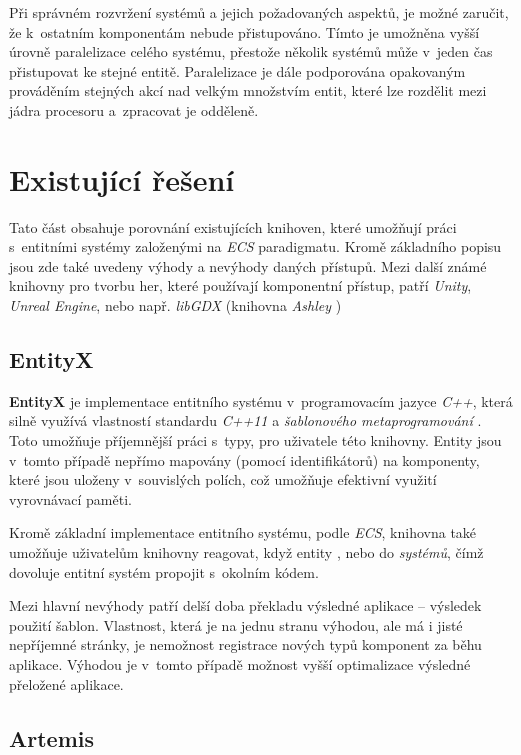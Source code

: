 Při správném rozvržení systémů a jejich požadovaných aspektů, je možné zaručit, že k~ostatním komponentám nebude přistupováno. Tímto je umožněna vyšší úrovně paralelizace celého systému, přestože několik systémů může v~jeden čas přistupovat ke stejné entitě. Paralelizace je dále podporována opakovaným prováděním stejných akcí nad velkým množstvím entit, které lze rozdělit mezi jádra procesoru a~zpracovat je odděleně.

\section{Existující řešení}

Tato část obsahuje porovnání existujících knihoven, které umožňují práci s~entitními systémy založenými na \emph{ECS} paradigmatu. Kromě základního popisu jsou zde také uvedeny výhody a nevýhody daných přístupů. Mezi další známé knihovny pro tvorbu her, které používají komponentní přístup, patří \emph{Unity}, \emph{Unreal Engine}, nebo např. \emph{libGDX} (knihovna \emph{Ashley} \cite{Ashley})

\subsection{EntityX}

\textbf{EntityX} \cite{EntityX} je implementace entitního systému v~programovacím jazyce \emph{C++}, která silně využívá vlastností standardu \emph{C++11} a \emph{šablonového metaprogramování} \cite{CppMetaprogramming}. Toto umožňuje příjemnější práci s~typy, pro uživatele této knihovny. Entity jsou v~tomto případě nepřímo mapovány (pomocí identifikátorů) na komponenty, které jsou uloženy v~souvislých polích, což umožňuje efektivní využití vyrovnávací paměti. 

Kromě základní implementace entitního systému, podle \emph{ECS}, knihovna také umožňuje uživatelům knihovny reagovat, když entity , nebo  do \emph{systémů}, čímž dovoluje entitní systém propojit s~okolním kódem.

Mezi hlavní nevýhody patří delší doba překladu výsledné aplikace -- výsledek použití šablon. Vlastnost, která je na jednu stranu výhodou, ale má i jisté nepříjemné stránky, je nemožnost registrace nových typů komponent za běhu aplikace. Výhodou je v~tomto případě možnost vyšší optimalizace výsledné přeložené aplikace.

\subsection{Artemis}

